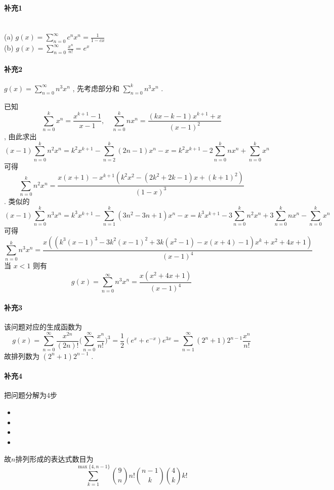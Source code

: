 \documentclass[a4paper, UTF8]{ctexart}				%
\numberwithin{equation}{section}				%
\begin{document}
    \paragraph{补充1}\quad\\
        (a) $g(x) = \sum^{\infty}_{n=0} c^n x^n= \frac{1}{1 - cx}$\\
        (b) $g(x) = \sum^{\infty}_{n=0} \frac{x^n}{n!} = e^x$
    \paragraph{补充2}\quad 
        $g(x) = \sum^{\infty}_{n=0} n^3 x^n$ , 先考虑部分和 $\sum^{k}_{n=0} n^3 x^n$ . 
        
        已知 $$\sum^{k}_{n=0} x^n = \frac{x^{k+1}-1}{x-1} , \quad \sum^{k}_{n=0} nx^n = \frac{(kx-k-1)x^{k+1}+x}{(x-1)^2}$$ , 由此求出
        \[
            (x - 1) \sum^{k}_{n=0} n^2 x^n = k^2 x^{k+1} - \sum^{k}_{n=2} (2n-1) x^n - x 
            = k^2 x^{k+1} - 2 \sum^{k}_{n=0} nx^n + \sum^{k}_{n=0} x^n
        \]
        可得 $$\sum^{k}_{n=0} n^2 x^n = \frac{x (x+1)-x^{k+1} (k^2 x^2-(2 k^2+2 k-1) x+(k+1)^2)}{(1-x)^3}$$ . 类似的 
        \[
            (x - 1) \sum^{k}_{n=0} n^3 x^n = k^3 x^{k+1} - \sum^{k}_{n=1} (3n^2-3n+1) x^n - x 
            = k^3 x^{k+1} - 3 \sum^{k}_{n=0} n^2 x^n + 3 \sum^{k}_{n=0} n x^n - \sum^{k}_{n=0}x^n
        \]
        可得 
        \[
            \sum^{k}_{n=0} n^3 x^n = \frac{x ((k^3 (x-1)^3-3 k^2 (x-1)^2+3 k (x^2-1)-x (x+4)-1) x^k+ x^2+4x+1)}{(x-1)^4}
        \]
        当 $x < 1$ 则有 
        \[
            g(x) = \sum^{\infty}_{n=0} n^3 x^n = \frac{x (x^2+4 x+1)}{(x-1)^4}
        \]
    \paragraph{补充3}\quad 
        该问题对应的生成函数为 
        \[
            g(x) = \sum^{\infty}_{n=0} \frac{x^{2n}}{(2n)!} \Bigg(\sum^{\infty}_{n=0} \frac{x^n}{n!}\Bigg)^3 = \frac{1}{2} (e^x + e^{-x}) e^{3x} = \sum^{\infty}_{n=1} (2^n+1)2^{n-1} \frac{x^n}{n!}
        \]
        故排列数为 $(2^n+1)2^{n-1}$ .
    \paragraph{补充4}\quad 
        把问题分解为4步
        \begin{itemize}
            \item {}
            \item {}
            \item {}
            \item {}
        \end{itemize}
        故$n$排列形成的表达式数目为 
        \[
            \sum^{\max \{4, n-1\}}_{k=1}{{9} \choose {n}}n! {{n-1} \choose {k}} {{4} \choose {k}}k!
        \]
\end{document}
